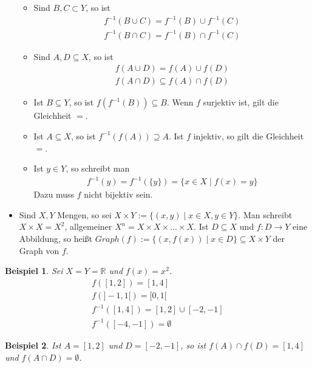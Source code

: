 \documentclass[a4paper,10pt]{article}
\newtheorem{example}{Beispiel}
\begin{document}
\begin{itemize}
\begin{itemize}
  \item Sind $B, C \subset Y$, so ist
  \begin{align}
   f^{-1}(B \cup C) = f^{-1}(B) \cup f^{-1}(C)\\
   f^{-1}(B \cap C) = f^{-1}(B) \cap f^{-1}(C)
  \end{align}
  
  \item Sind $A, D \subseteq X$, so ist 
  \begin{align}
   f(A \cup D) = f(A) \cup f(D)\\
   f(A \cap D) \subseteq f(A) \cap f(D)
  \end{align}
  
  \item Ist $B \subseteq Y$, so ist $f(f^{-1}(B)) \subseteq B$.
  Wenn $f$ surjektiv ist, gilt die Gleichheit $=$.
  
  \item Ist $A \subseteq X$, so ist $f^{-1}(f(A)) \supseteq A$.
  Ist $f$ injektiv, so gilt die Gleichheit $=$.
  
  \item Ist $y \in Y$, so schreibt man
  \begin{align}
   f^{-1}(y) = f^{-1}(\{y\}) = \{x \in X \mid f(x) = y\}
  \end{align}
  Dazu muss $f$ nicht bijektiv sein.
 \end{itemize}
 
 \item Sind $X, Y$ Mengen, so sei $X \times Y := \{(x, y) \mid x \in X, y \in Y\}$.
 Man schreibt $X \times X = X^2$, allgemeiner $X^n = X \times X \times \dots \times X$.
 Ist $D \subseteq X$ und $f: D \rightarrow Y$ eine Abbildung, so heißt $Graph(f) := \{(x, f(x)) \mid x \in D\} \subseteq X \times Y$ der Graph von $f$.
\end{itemize}

\begin{example}
 Sei $X = Y = \mathbb{R}$ und $f(x) = x^2$.
 \begin{align}
  f([1, 2]) = [1, 4]\\
  f(]-1, 1[) = [0, 1[\\
  f^{-1}([1, 4]) = [1, 2] \cup [-2, -1]\\
  f^{-1}([-4, -1]) = \emptyset
 \end{align}
\end{example}

\begin{example}
 Ist $A = [1, 2]$ und $D = [-2, -1]$, so ist $f(A) \cap f(D) = [1, 4]$ und $f(A \cap D) = \emptyset$.
\end{example}
\end{document}
